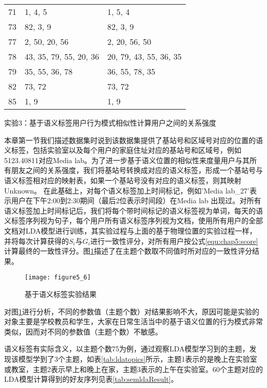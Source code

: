 \begin{table}[htbp]
\begin{tabular}{cll}
      71 & 1, 4, 5 & 1, 5, 4\\
      73 & 82, 3, 9 & 82, 3, 9\\
      77 & 2, 50, 20, 56 & 2, 20, 56, 50\\
      78 & 43, 35, 79, 55, 20, 36 & 20, 79, 43, 55, 36, 35\\
      79 & 35, 55, 36, 78 & 36, 55, 78, 35\\
      82 & 73, 72 & 73, 72\\
      85 & 1, 9 & 1, 9\\
      \bottomrule[1.5pt]
    \end{tabular}
\end{table}
\par 实验3：基于语义标签用户行为模式相似性计算用户之间的关系强度
\par 本章第一节我们描述数据集时说到该数据集提供了基站号和区域号对应的位置的语义标签，包括实验室以及每个用户的家庭住址对应的基站号和区域号，例如5123.40811对应Media lab。为了进一步基于语义位置的相似性来度量用户与其所有朋友之间的关系强度，我们将基站号转换成对应的语义标签，形成一个基站号与语义标签相对应的映射表，如果一个基站号没有对应的语义标签，则其映射Unknown。 在此基础上，对每个语义标签加上时间标记，例如'Media lab\_27'表示用户在下午2:00到2:30期间（最后2位表示时间段）在Media lab 出现过。对所有语义标签加上时间标记后，我们将每个带时间标记的语义标签视为单词，每天的语义标签序列视为句子，每个用户所有语义标签序列视为文档，使用所有用户的全部文档对LDA模型进行训练，其实验过程与上面的基于物理位置的实验过程一样，并将每次计算获得的$S_{i}$与$G_{i}$进行一致性评分，对所有用户按公式\ref{equ:chap5:score}计算最终的一致性评分。图\ref{fig:5_6}描述了在主题个数取不同值时所对应的一致性评分结果。
\begin{figure}[htp]
\centering
\texttt{[image: figure5\_6]}
\caption{基于语义标签实验结果}
\label{fig:5_6}
\end{figure}
\par 对图\ref{fig:5_6}进行分析，不同的参数值（主题个数）对结果影响不大，原因可能是实验的对象主要是学校教员和学生，大家在日常生活当中的基于语义位置的行为模式非常类似，因而对不同的参数值（主题个数）不敏感。
\par 语义标签有实际含义，以主题个数75为例，通过观察LDA模型学习到的主题，发现该模型学到了3个主题，如表\ref{tab:ldatopics}所示，主题1表示的是晚上在实验室或教室，主题2表示早上和晚上在家，主题3表示的上午在实验室。60个主题对应的LDA模型计算得到的好友序列见表\ref{tab:semldaResult}。
